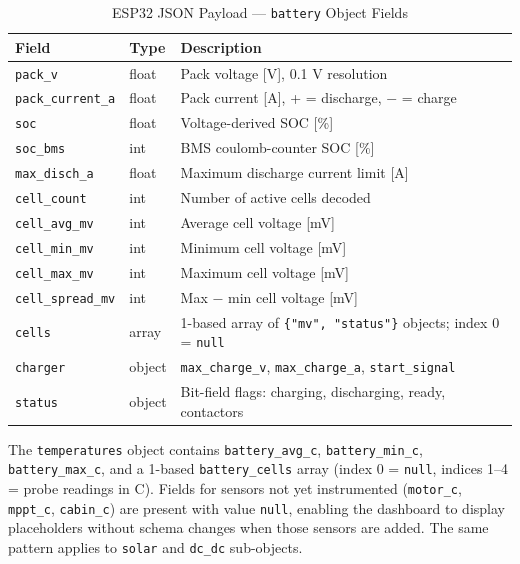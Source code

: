\begin{table}[h]
    \centering
    \caption{ESP32 JSON Payload — \texttt{battery} Object Fields}
    \label{tab:json-schema-battery}
    \begin{tabular}{lll}
        \toprule
        \textbf{Field} & \textbf{Type} & \textbf{Description} \\
        \midrule
        \texttt{pack\_v}          & float  & Pack voltage [V], 0.1 V resolution \\
        \texttt{pack\_current\_a} & float  & Pack current [A], + = discharge, $-$ = charge \\
        \texttt{soc}              & float  & Voltage-derived SOC [\%] \\
        \texttt{soc\_bms}         & int    & BMS coulomb-counter SOC [\%] \\
        \texttt{max\_disch\_a}    & float  & Maximum discharge current limit [A] \\
        \texttt{cell\_count}      & int    & Number of active cells decoded \\
        \texttt{cell\_avg\_mv}    & int    & Average cell voltage [mV] \\
        \texttt{cell\_min\_mv}    & int    & Minimum cell voltage [mV] \\
        \texttt{cell\_max\_mv}    & int    & Maximum cell voltage [mV] \\
        \texttt{cell\_spread\_mv} & int    & Max $-$ min cell voltage [mV] \\
        \texttt{cells}            & array  & 1-based array of \texttt{\{"mv", "status"\}} objects; index 0 = \texttt{null} \\
        \texttt{charger}          & object & \texttt{max\_charge\_v}, \texttt{max\_charge\_a}, \texttt{start\_signal} \\
        \texttt{status}           & object & Bit-field flags: charging, discharging, ready, contactors \\
        \bottomrule
    \end{tabular}
\end{table}

The \texttt{temperatures} object contains \texttt{battery\_avg\_c}, \texttt{battery\_min\_c}, \texttt{battery\_max\_c}, and a 1-based \texttt{battery\_cells} array (index 0 = \texttt{null}, indices 1--4 = probe readings in \textdegree C). Fields for sensors not yet instrumented (\texttt{motor\_c}, \texttt{mppt\_c}, \texttt{cabin\_c}) are present with value \texttt{null}, enabling the dashboard to display placeholders without schema changes when those sensors are added. The same pattern applies to \texttt{solar} and \texttt{dc\_dc} sub-objects.

